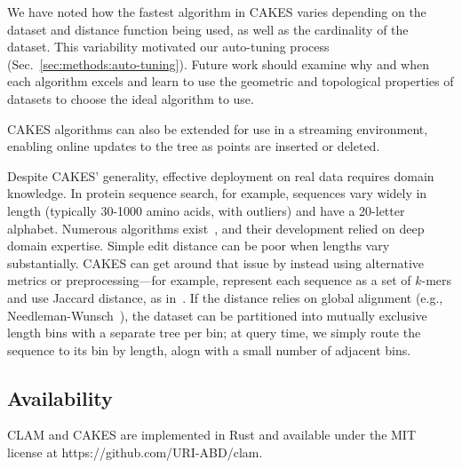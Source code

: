 We have noted how the fastest algorithm in CAKES varies depending on the dataset and distance function being used, as well as the cardinality of the dataset.
This variability motivated our auto-tuning process (Sec.~\ref{sec:methods:auto-tuning}).
Future work should examine why and when each algorithm excels and learn to use the geometric and topological properties of datasets to choose the ideal algorithm to use.

CAKES algorithms can also be extended for use in a streaming environment, enabling online updates to the tree as points are inserted or deleted.

Despite CAKES' generality, effective deployment on real data requires domain knowledge.
In protein sequence search, for example, sequences vary widely in length (typically 30-1000 amino acids, with outliers) and have a 20-letter alphabet.
Numerous algorithms exist~\cite{kim2021entrance, daniels2013compressive, yu2015entropy, steinegger2018clustering}, and their development relied on deep domain expertise.
Simple edit distance can be poor when lengths vary substantially.
CAKES can get around that issue by instead using alternative metrics or preprocessing—for example, represent each sequence as a set of $k$-mers and use Jaccard distance, as in~\cite{kim2021entrance}.
If the distance relies on global alignment (e.g., Needleman-Wunsch~\cite{needleman1970general}), the dataset can be partitioned into mutually exclusive length bins with a separate tree per bin;
at query time, we simply route the sequence to its bin by length, alogn with a small number of adjacent bins.

\subsection{Availability}

CLAM and CAKES are implemented in Rust and available under the MIT license at https://github.com/URI-ABD/clam.
